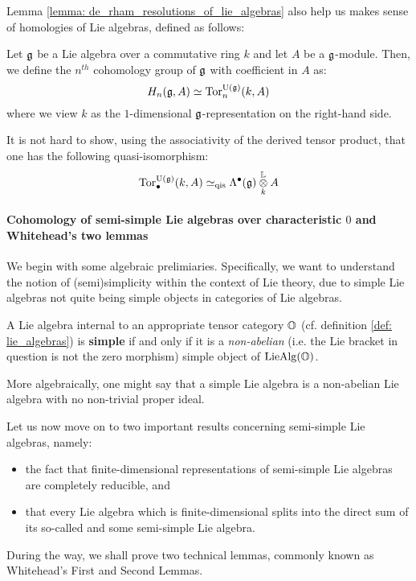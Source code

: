                     Lemma \ref{lemma: de_rham_resolutions_of_lie_algebras} also help us makes sense of homologies of Lie algebras, defined as follows:
                    \begin{definition} \label{def: lie_algebra_homologies}
                        Let $\mathfrak{g}$ be a Lie algebra over a commutative ring $k$ and let $A$ be a $\mathfrak{g}$-module. Then, we define the $n^{th}$ cohomology group of $\mathfrak{g}$ with coefficient in $A$ as:
                            $$H_n(\mathfrak{g}, A) \simeq \mathrm{Tor}_n^{\mathrm{U}(\mathfrak{g})}(k, A)$$
                        where we view $k$ as the $1$-dimensional $\mathfrak{g}$-representation on the right-hand side. 
                    \end{definition}
                    \begin{remark}
                        It is not hard to show, using the associativity of the derived tensor product, that one has the following quasi-isomorphism:
                            $$\Tor_{\bullet}^{\U(\g)}(k, A) \cong_{\qis} \Lambda^{\bullet}(\g) \tensor_k^{\L} A$$
                    \end{remark}
                
                \paragraph{Cohomology of semi-simple Lie algebras over characteristic \texorpdfstring{$0$}{} and Whitehead's two lemmas}
                    We begin with some algebraic prelimiaries. Specifically, we want to understand the notion of (semi)simplicity within the context of Lie theory, due to simple Lie algebras not quite being simple objects in categories of Lie algebras.
                    \begin{definition} \label{def: simple_lie_algebras}
                        A Lie algebra internal to an appropriate tensor category $\mathbb{O}$ (cf. definition \ref{def: lie_algebras}) is \textbf{simple} if and only if it is a \textit{non-abelian} (i.e. the Lie bracket in question is not the zero morphism) simple object of $\mathrm{Lie}\mathrm{Alg}(\mathbb{O})$.
                        
                        More algebraically, one might say that a simple Lie algebra is a non-abelian Lie algebra with no non-trivial proper ideal.
                    \end{definition}
                
                    Let us now move on to two important results concerning semi-simple Lie algebras, namely:
                        \begin{itemize}
                            \item the fact that finite-dimensional representations of semi-simple Lie algebras are completely reducible, and
                            \item that every Lie algebra which is finite-dimensional splits into the direct sum of its so-called  and some semi-simple Lie algebra. 
                        \end{itemize}
                    During the way, we shall prove two technical lemmas, commonly known as Whitehead's First and Second Lemmas.
                    
